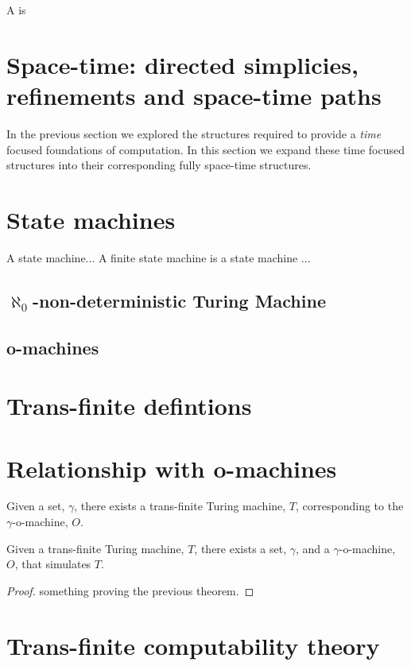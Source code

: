 \documentclass[a4paper,openany]{amsart}
\begin{document}
\begin{definition}
A  is 
\end{definition}

\section{Space-time: directed simplicies, refinements and space-time paths}

In the previous section we explored the structures required to provide a \emph{time} focused 
foundations of computation. In this section we expand these time focused structures into 
their corresponding fully space-time structures.

\section{State machines}

\begin{definition}

A state machine... A finite state machine is a state machine ...

\end{definition}

\subsection{$\aleph_0$-non-deterministic Turing Machine}

\subsection{o-machines}

\section{Trans-finite defintions}

\section{Relationship with o-machines}

\begin{theorem}

Given a set, $\gamma$, there exists a trans-finite Turing machine, $T$, corresponding to
the $\gamma$-o-machine, $O$.

\end{theorem}


\begin{theorem}

Given a trans-finite Turing machine, $T$, there exists a set, $\gamma$, and a
$\gamma$-o-machine, $O$, that simulates $T$.

\end{theorem}

\begin{proof}
something proving the previous theorem.
\end{proof}

\section{Trans-finite computability theory}




\end{document}
